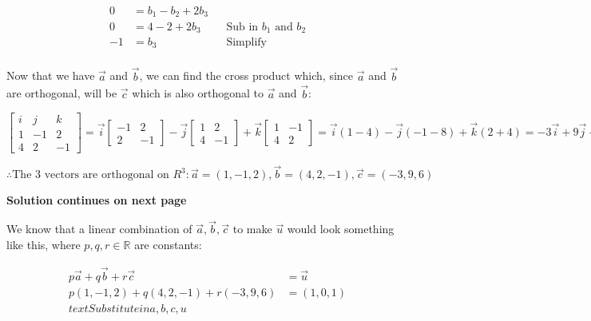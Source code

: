 \documentclass[12pt]{book}
\begin{document}
\begin{enumerate}
 \addtolength{\jot}{0.3em}
 \begin{align*}
  0 &= b_1 - b_2 + 2b_3 \\
  0 &= 4 - 2 + 2b_3 && \text{Sub in } b_1 \text{ and } b_2\\
  -1 &= b_3 && \text{Simplify} \\
 \end{align*}

 Now that we have $\vec{a}$ and $\vec{b}$, we can find the cross product which, 
 since $\vec{a}$ and $\vec{b}$ are orthogonal, will be $\vec{c}$ which is also orthogonal 
 to $\vec{a}$ and $\vec{b}$:

\vspace{0.5cm}

 $
 \begin{bmatrix}
  i & j & k \\  1 & -1 & 2 \\ 4 & 2 & -1
\end{bmatrix}
= \vec{i}
\begin{bmatrix}
  -1 & 2 \\ 2 & -1
\end{bmatrix}
 - \vec{j}
 \begin{bmatrix}
  1 & 2 \\ 4 & -1
\end{bmatrix}
 + \vec{k}
 \begin{bmatrix}
  1 & -1 \\ 4 & 2
\end{bmatrix}
= \vec{i}(1-4) - \vec{j}(-1-8) + \vec{k}(2+4)
= -3\vec{i} + 9\vec{j} + 6\vec{k}
$

\vspace{0.5cm}

\begin{center}
  $\boxed{\therefore \text{The 3 vectors are orthogonal on } R^3: \vec{a} = (1, -1, 2), \vec{b} = (4, 2, -1), \vec{c} = (-3, 9, 6)}$
  \vspace{1cm}

  \textbf{Solution continues on next page}

\end{center}

\newpage

We know that a linear combination of $\vec{a}, \vec{b}, \vec{c}$ to make $\vec{u}$ would 
look something like this, where $p, q, r \in \mathbb{R}$ are constants:

\begin{align*}
 p\vec{a} + q\vec{b} + r\vec{c} &= \vec{u} \\
 p(1, -1, 2) + q(4, 2, -1) + r(-3, 9, 6) &= (1, 0, 1) \\text{Substitute in a, b, c, u}\\
\end{align*}


\end{enumerate}
\end{document}
